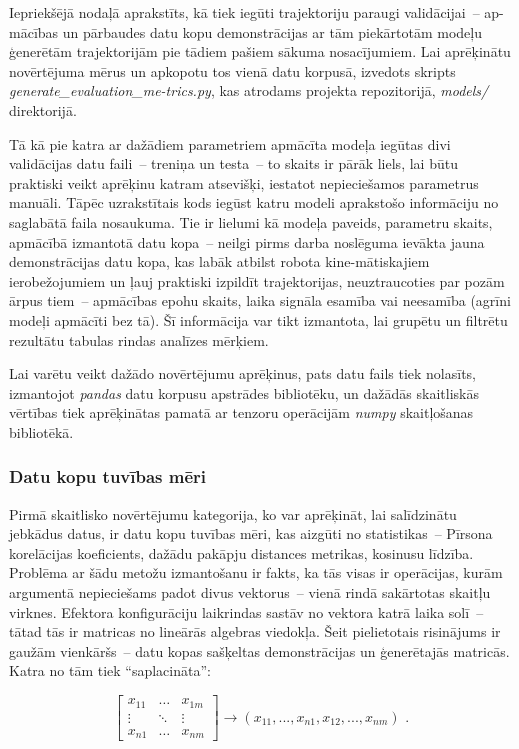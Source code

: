 \documentclass[12pt, a4paper]{article}
\numberwithin{equation}{section} %
\begin{document}
Iepriekšējā nodaļā aprakstīts, kā tiek iegūti trajektoriju paraugi validācijai~-- ap-mācības un pārbaudes datu kopu demonstrācijas ar tām piekārtotām modeļu ģenerētām trajektorijām pie tādiem pašiem sākuma nosacījumiem. Lai aprēķinātu novērtējuma mērus un apkopotu tos vienā datu korpusā, izvedots skripts \textit{generate\_evaluation\_me-trics.py}, kas atrodams projekta repozitorijā, \textit{models/} direktorijā.

Tā kā pie katra ar dažādiem parametriem apmācīta modeļa iegūtas divi validācijas datu faili~-- treniņa un testa~-- to skaits ir pārāk liels, lai būtu praktiski veikt aprēķinu katram atsevišķi, iestatot nepieciešamos parametrus manuāli. Tāpēc uzrakstītais kods iegūst katru modeli aprakstošo informāciju no saglabātā faila nosaukuma. Tie ir lielumi kā modeļa paveids, parametru skaits, apmācībā izmantotā datu kopa~-- neilgi pirms darba noslēguma ievākta jauna demonstrācijas datu kopa, kas labāk atbilst robota kine-mātiskajiem ierobežojumiem un ļauj praktiski izpildīt trajektorijas, neuztraucoties par pozām ārpus tiem~-- apmācības epohu skaits, laika signāla esamība vai neesamība (agrīni modeļi apmācīti bez tā). Šī informācija var tikt izmantota, lai grupētu un filtrētu rezultātu tabulas rindas analīzes mērķiem.

Lai varētu veikt dažādo novērtējumu aprēķinus, pats datu fails tiek nolasīts, izmantojot \textit{pandas} datu korpusu apstrādes bibliotēku, un dažādās skaitliskās vērtības tiek aprēķinātas pamatā ar tenzoru operācijām \textit{numpy} skaitļošanas bibliotēkā.

\subsubsection{Datu kopu tuvības mēri}

Pirmā skaitlisko novērtējumu kategorija, ko var aprēķināt, lai salīdzinātu jebkādus datus, ir datu kopu tuvības mēri, kas aizgūti no statistikas~-- Pīrsona korelācijas koeficients, dažādu pakāpju distances metrikas, kosinusu līdzība. Problēma ar šādu metožu izmantošanu ir fakts, ka tās visas ir operācijas, kurām argumentā nepieciešams padot divus vektorus~-- vienā rindā sakārtotas skaitļu virknes. Efektora konfigurāciju laikrindas sastāv no vektora katrā laika solī~-- tātad tās ir matricas no lineārās algebras viedokļa. Šeit pielietotais risinājums ir gaužām vienkāršs~-- datu kopas sašķeltas demonstrācijas un ģenerētajās matricās. Katra no tām tiek ``saplacināta'':

\begin{equation}
    \begin{bmatrix}
        x_{11} & \ldots & x_{1m} \\
        \vdots & \ddots & \vdots \\
        x_{n1} & \ldots & x_{nm}
    \end{bmatrix}
    \rightarrow
    (x_{11}, ..., x_{n1}, x_{12}, ..., x_{nm})
\text{ .}
\end{equation}
\end{document}
